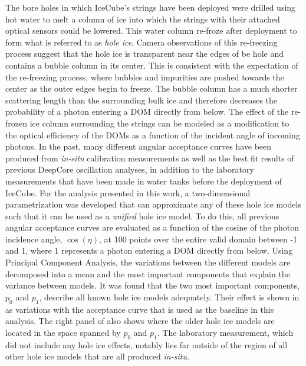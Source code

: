 The bore holes in which IceCube's strings have been deployed were drilled using hot water to melt a column of ice into which the strings with their attached optical sensors could be lowered.
This water column re-froze after deployment to form what is referred to as \emph{hole ice}.
Camera observations of this re-freezing process suggest that the hole ice is transparent near the edges of be hole and contains a bubble column in its center.
This is consistent with the expectation of the re-freezing process, where bubbles and impurities are pushed towards the center as the outer edges begin to freeze.
The bubble column has a much shorter scattering length than the surrounding bulk ice and therefore decreases the probability of a photon entering a DOM directly from below.
The effect of the re-frozen ice column surrounding the strings can be modeled as a modification to the optical efficiency of the DOMs as a function of the incident angle of incoming photons.
In the past, many different angular acceptance curves have been produced from \emph{in-situ} calibration measurements as well as the best fit results of previous DeepCore oscillation analyses, in addition to the laboratory measurements that have been made in water tanks before the deployment of IceCube.
For the analysis presented in this work, a two-dimensional parametrization was developed that can approximate any of these hole ice models such that it can be used as a \emph{unified} hole ice model.
To do this, all previous angular acceptance curves are evaluated as a function of the cosine of the photon incidence angle, $\cos(\eta)$, at 100 points over the entire valid domain between -1 and 1, where 1 represents a photon entering a DOM directly from below.
Using Principal Component Analysis, the variations between the different models are decomposed into a mean and the most important components that explain the variance between models.
It was found that the two most important components, $p_0$ and $p_1$, describe all known hole ice models adequately.
Their effect is shown in  as variations with the acceptance curve that is used as the baseline in this analysis.
The right panel of  also shows where the older hole ice models are located in the space spanned by $p_0$ and $p_1$.
The laboratory measurement, which did not include any hole ice effects, notably lies far outside of the region of all other hole ice models that are all produced \emph{in-situ}.

